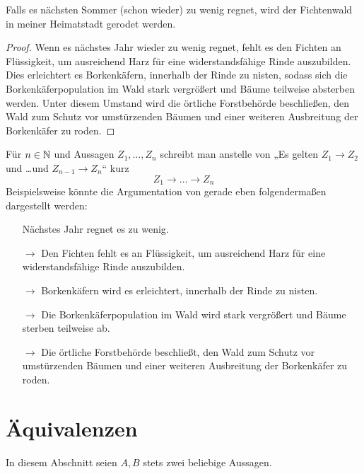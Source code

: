 \begin{bsp}
    Falls es nächsten Sommer (schon wieder) zu wenig regnet, wird der Fichtenwald in meiner Heimatstadt gerodet werden.
\end{bsp}
\begin{proof}
    Wenn es nächstes Jahr wieder zu wenig regnet, fehlt es den Fichten an Flüssigkeit, um ausreichend Harz für eine widerstandsfähige Rinde auszubilden. Dies erleichtert es Borkenkäfern, innerhalb der Rinde zu nisten, sodass sich die Borkenkäferpopulation im Wald stark vergrößert und Bäume teilweise absterben werden. Unter diesem Umstand wird die örtliche Forstbehörde beschließen, den Wald zum Schutz vor umstürzenden Bäumen und einer weiteren Ausbreitung der Borkenkäfer zu roden.
\end{proof}

  
\begin{nota}[*]
    Für $n\in \mathbb N$ und Aussagen $Z_1,\dots , Z_n$ schreibt man anstelle von „Es gelten $Z_1\to Z_2$ und \dots und $Z_{n-1}\to Z_n$“ kurz
        \[ Z_1\to \dots \to Z_n\]
    Beispielsweise könnte die Argumentation von gerade eben folgendermaßen dargestellt werden:
    \begin{itemize}
        \item[] Nächstes Jahr regnet es zu wenig.
        \item[$\to$] Den Fichten fehlt es an Flüssigkeit, um ausreichend Harz für eine widerstandsfähige Rinde auszubilden.
        \item[$\to$] Borkenkäfern wird es erleichtert, innerhalb der Rinde zu nisten.
        \item[$\to$] Die Borkenkäferpopulation im Wald wird stark vergrößert und Bäume sterben teilweise ab.
        \item[$\to$] Die örtliche Forstbehörde beschließt, den Wald zum Schutz vor umstürzenden Bäumen und einer weiteren Ausbreitung der Borkenkäfer zu roden.   
    \end{itemize}
\end{nota}





\section{Äquivalenzen}


In diesem Abschnitt seien $A,B$ stets zwei beliebige Aussagen.


